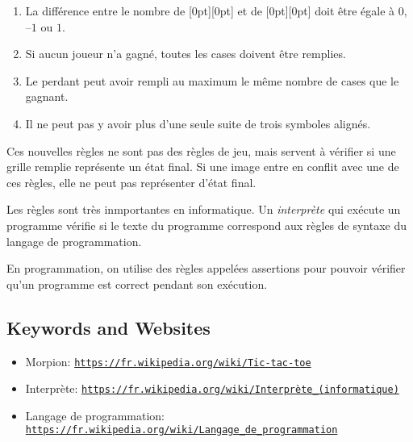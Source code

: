 \documentclass[a4paper,11pt]{report}
\newcommand{\BrochureUrlText}[1]{\texttt{#1}}
\newcommand{\taskGraphicsFolder}{..}
\begin{document}
\begin{enumerate}
  \item La différence entre le nombre de \raisebox{-0.5ex}[0pt][0pt]{} et de \raisebox{-0.5ex}[0pt][0pt]{} doit être égale à $0$, –$1$ ou $1$.
  \item Si aucun joueur n’a gagné, toutes les cases doivent être remplies.
  \item Le perdant peut avoir rempli au maximum le même nombre de cases que le gagnant.
  \item Il ne peut pas y avoir plus d’une seule suite de trois symboles alignés.
\end{enumerate}

Ces nouvelles règles ne sont pas des règles de jeu, mais servent à vérifier si une grille remplie représente un état final. Si une image entre en conflit avec une de ces règles, elle ne peut pas représenter d’état final.

Les règles sont très inmportantes en informatique. Un \emph{interprète} qui exécute un programme vérifie si le texte du programme correspond aux règles de syntaxe du langage de programmation.

En programmation, on utilise des règles appelées assertions pour pouvoir vérifier qu’un programme est correct pendant son exécution.

{\raggedright

\subsection*{Keywords and Websites}

\begin{itemize}
  \item Morpion: \href{https://fr.wikipedia.org/wiki/Tic-tac-toe}{\BrochureUrlText{https://fr.wikipedia.org/wiki/Tic-tac-toe}}
  \item Interprète: \href{https://fr.wikipedia.org/wiki/Interpr\%C3\%A8te_(informatique)}{\BrochureUrlText{https://fr.wikipedia.org/wiki/Interprète\_(informatique)}}
  \item Langage de programmation: \href{https://fr.wikipedia.org/wiki/Langage_de_programmation}{\BrochureUrlText{https://fr.wikipedia.org/wiki/Langage\_de\_programmation}}
\end{itemize}


}
\end{document}
